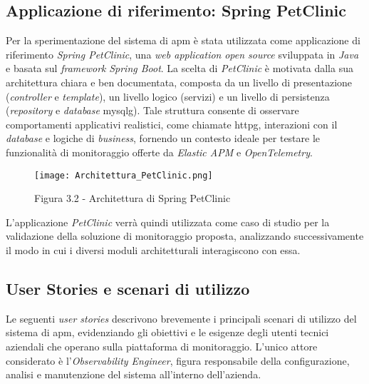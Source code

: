 \subsection{Applicazione di riferimento: Spring PetClinic}
Per la sperimentazione del sistema di \gls{apm} è stata utilizzata come applicazione di riferimento \emph{Spring PetClinic}, una \emph{web application} \emph{open source} sviluppata in \emph{Java} e basata sul \emph{framework} \emph{Spring Boot}.  
La scelta di \emph{PetClinic} è motivata dalla sua architettura chiara e ben documentata, composta da un livello di presentazione (\emph{controller} e \emph{template}), un livello logico (servizi) e un livello di persistenza (\emph{repository} e \emph{database} \gls{mysqlg}\glsfirstoccur).  
Tale struttura consente di osservare comportamenti applicativi realistici, come chiamate \gls{httpg}\glsfirstoccur, interazioni con il \emph{database} e logiche di \emph{business}, fornendo un contesto ideale per testare le funzionalità di monitoraggio offerte da \emph{Elastic APM} e \emph{OpenTelemetry}.  

\begin{figure}[!h] 
    \centering 
    \texttt{[image: Architettura\_PetClinic.png]} 
    \caption{Figura 3.2 - Architettura di Spring PetClinic}
\end{figure}


L'applicazione \emph{PetClinic} verrà quindi utilizzata come caso di studio per la validazione della soluzione di monitoraggio proposta, analizzando successivamente il modo in cui i diversi moduli architetturali interagiscono con essa.
\newpage

\subsection{User Stories e scenari di utilizzo}
Le seguenti \emph{user stories} descrivono brevemente i principali scenari di utilizzo del sistema di \gls{apm}, evidenziando gli obiettivi e le esigenze degli utenti tecnici aziendali che operano sulla piattaforma di monitoraggio.  
L'unico attore considerato è l'\emph{Observability Engineer}, figura responsabile della configurazione, analisi e manutenzione del sistema all'interno dell'azienda.

